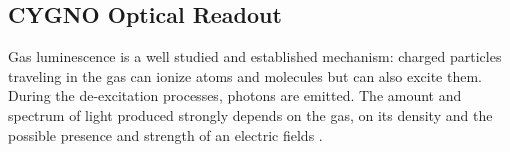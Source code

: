 \documentclass[physics,article,submit,moreauthors,pdftex]{Definitions/mdpi}
\begin{document}




\subsection{CYGNO Optical Readout}
\label{sect:opro}

Gas luminescence is a well studied and established mechanism: charged particles traveling in the gas can ionize atoms and molecules but can also excite them. During the de-excitation processes, photons are emitted. The amount and spectrum of light produced strongly depends on the gas, on its density and the possible presence and strength of an electric fields \cite{bib:Fraga, bib:Margato2, bib:lumi}.
\end{document}
